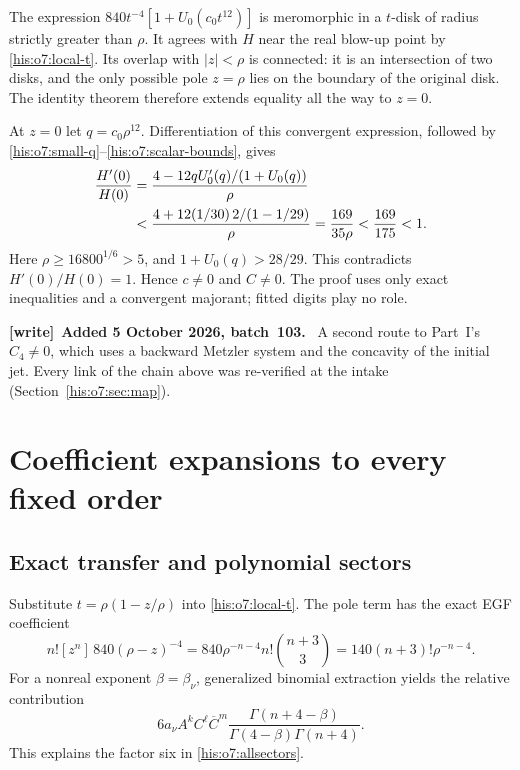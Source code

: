 \documentclass[11pt]{article}
\theoremstyle{remark}\newtheorem{remark}[theorem]{Remark}
\newcommand{\bC}{\overline C}
\numberwithin{equation}{section}
\newenvironment{writenote}[1][]{\par\smallskip\begingroup\small
 \noindent\textbf{[write]}\if\relax\detokenize{#1}\relax\else~\textbf{#1.}\fi\ }%
 {\par\endgroup\smallskip}
\begin{document}
The expression $840t^{-4}[1+U_0(c_0t^{12})]$ is meromorphic in
a $t$-disk of radius strictly greater than $\rho$.
It agrees with $H$ near the real blow-up point by \eqref{his:o7:local-t}.
Its overlap with $|z|<\rho$ is connected: it is an intersection
of two disks, and the only possible pole $z=\rho$ lies on the
boundary of the original disk. The identity theorem therefore
extends equality all the way to $z=0$.

At $z=0$ let $q=c_0\rho^{12}$. Differentiation of this convergent
expression, followed by \eqref{his:o7:small-q}--\eqref{his:o7:scalar-bounds}, gives
\begin{align}
\frac{H'(0)}{H(0)}
&=\frac{4-12qU_0'(q)/(1+U_0(q))}{\rho}\notag\\
&<\frac{4+12(1/30)\,2/(1-1/29)}{\rho}
=\frac{169}{35\rho}<\frac{169}{175}<1.\label{his:o7:contradiction}
\end{align}
Here $\rho\ge16800^{1/6}>5$, and $1+U_0(q)>28/29$.
This contradicts $H'(0)/H(0)=1$. Hence $c\ne0$ and $C\ne0$.
The proof uses only exact inequalities and a convergent majorant;
fitted digits play no role.
\begin{writenote}[Added 5 October 2026, batch~103]
A second route to Part~I's $C_4\ne0$, which uses a backward Metzler system and the concavity of the initial jet. Every link of the chain above was re-verified at the intake (Section~\ref{his:o7:sec:map}).
\end{writenote}


\section{Coefficient expansions to every fixed order}\label{his:o7:transfer}
\subsection{Exact transfer and polynomial sectors}
Substitute $t=\rho(1-z/\rho)$ into \eqref{his:o7:local-t}.
The pole term has the exact EGF coefficient
\begin{equation}\label{his:o7:leading-transfer}
n![z^n]\,840(\rho-z)^{-4}
=840\rho^{-n-4}n!\binom{n+3}{3}
=140(n+3)!\rho^{-n-4}.
\end{equation}
For a nonreal exponent $\beta=\beta_\nu$, generalized binomial
extraction yields the relative contribution
\begin{equation}\label{his:o7:gamma-term}
6a_\nu A^k C^\ell\bC^m
\frac{\Gamma(n+4-\beta)}{\Gamma(4-\beta)\Gamma(n+4)}.
\end{equation}
This explains the factor six in \eqref{his:o7:allsectors}.
\end{document}

